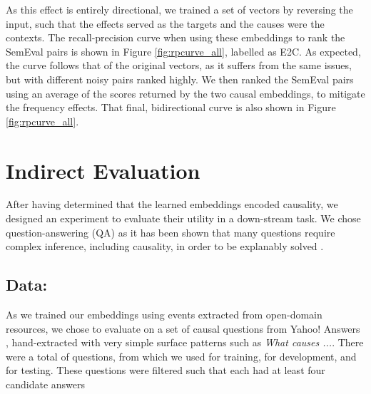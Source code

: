 As this effect is entirely directional, we trained a set of vectors by reversing the input, such that the effects served as the targets and the causes were the contexts.  The recall-precision curve when using these embeddings to rank the SemEval pairs is shown in Figure \ref{fig:rpcurve_all}, labelled as E2C.  As expected, the curve follows that of the original vectors, as it suffers from the same issues, but with different noisy pairs ranked highly.  We then ranked the SemEval pairs using an average of the scores returned by the two causal embeddings, to mitigate the frequency effects.  That final, bidirectional curve is also shown in Figure \ref{fig:rpcurve_all}.

\section{Indirect Evaluation}
\label{sec:indirecteval}

After having determined that the learned embeddings encoded causality, we designed an experiment to evaluate their utility in a down-stream task.  We chose question-answering (QA) as it has been shown that many questions require complex inference, including causality, in order to be explanably solved .  

\subsection{Data:}
As we trained our embeddings using events extracted from open-domain resources, we chose to evaluate on a set of causal questions from Yahoo! Answers , hand-extracted with very simple surface patterns such as \emph{What causes ...}.  There were a total of  questions, from which we used  for training,  for development, and  for testing.
These questions were filtered such that each had at least four candidate answers

